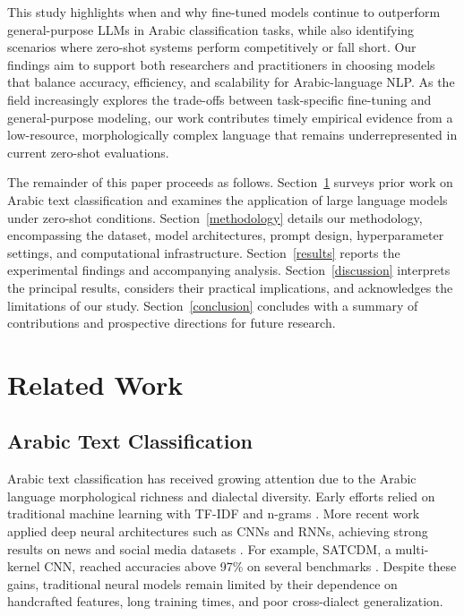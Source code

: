 \documentclass[preprint,12pt,authoryear]{elsarticle}
\begin{document}
This study highlights when and why fine-tuned models continue to outperform general-purpose LLMs in Arabic classification tasks, while also identifying scenarios where zero-shot systems perform competitively or fall short. Our findings aim to support both researchers and practitioners in choosing models that balance accuracy, efficiency, and scalability for Arabic-language NLP.
As the field increasingly explores the trade-offs between task-specific fine-tuning and general-purpose modeling, our work contributes timely empirical evidence from a low-resource, morphologically complex language that remains underrepresented in current zero-shot evaluations.

The remainder of this paper proceeds as follows. Section~\ref{rel-works} surveys prior work on Arabic text classification and examines the application of large language models under zero-shot conditions. Section~\ref{methodology} details our methodology, encompassing the dataset, model architectures, prompt design, hyperparameter settings, and computational infrastructure. Section~\ref{results} reports the experimental findings and accompanying analysis. Section~\ref{discussion} interprets the principal results, considers their practical implications, and acknowledges the limitations of our study. Section~\ref{conclusion} concludes with a summary of contributions and prospective directions for future research.

\section{Related Work}
\label{rel-works}

\subsection{Arabic Text Classification}
Arabic text classification has received growing attention due to the Arabic language morphological richness and dialectal diversity. Early efforts relied on traditional machine learning with TF-IDF and n-grams \cite{omar2021multi}. More recent work applied deep neural architectures such as CNNs and RNNs, achieving strong results on news and social media datasets \cite{muaad2022effective,almuzaini2020impact}. For example, SATCDM, a multi-kernel CNN, reached accuracies above 97\% on several benchmarks \cite{alhawarat2020superior}. Despite these gains, traditional neural models remain limited by their dependence on handcrafted features, long training times, and poor cross-dialect generalization.
\end{document}
